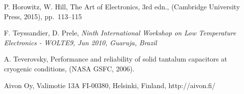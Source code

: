 \documentclass{twocol}
\begin{document}
\begin{thebibliography}{}
P. Horowitz, W. Hill,
The Art of Electronics, 3rd edn., (Cambridge University Press, 2015), pp.~113--115 %

F. Teyssandier, D. Prele,
\textit{Ninth International Workshop on Low Temperature Electronics - WOLTE9, Jun 2010, Guaruja, Brazil}

A. Teverovsky,
Performance and reliability of solid tantalum capacitors at cryogenic conditions,
(NASA GSFC, 2006).

Aivon Oy, Valimotie 13A FI-00380, Helsinki, Finland,
http://aivon.fi/









\end{thebibliography}
\end{document}
